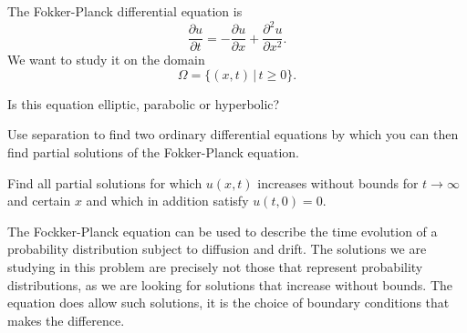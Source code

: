 The Fokker-Planck differential equation is
\[
\frac{\partial u}{\partial t}
=
-\frac{\partial u}{\partial x}+\frac{\partial^2u}{\partial x^2}.
\]
We want to study it on the domain
\[
\Omega=\{(x,t)\,|\,  t \ge 0\}.
\]
\begin{teilaufgaben}
\item
Is this equation elliptic, parabolic or hyperbolic?
\item
Use separation to find two ordinary differential equations by which
you can then find partial solutions of the Fokker-Planck equation.
\item
Find all partial solutions for which $u(x,t)$ increases without bounds
for $t\to\infty$ and certain $x$ and which in addition satisfy
$u(t,0)=0$.
\end{teilaufgaben}

\begin{diskussion}
The Fockker-Planck equation can be used to describe the time evolution
of a probability distribution subject to diffusion and drift.
The solutions we are studying in this problem are precisely not those that
represent probability distributions, as we are looking for solutions
that increase without bounds.
The equation does allow such solutions, it is the choice of
boundary conditions that makes the difference.
\end{diskussion}

